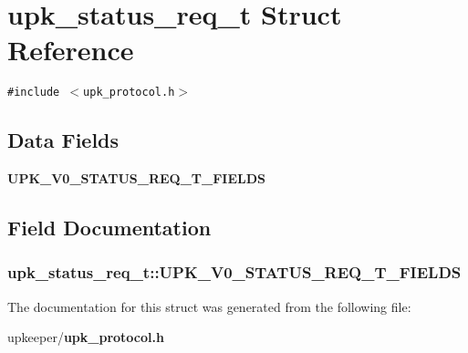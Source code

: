 \section{upk\_\-status\_\-req\_\-t Struct Reference}
\label{structupk__status__req__t}
{\tt \#include $<$upk\_\-protocol.h$>$}

\subsection*{Data Fields}
\begin{CompactItemize}
\item 
\bf{UPK\_\-V0\_\-STATUS\_\-REQ\_\-T\_\-FIELDS}
\end{CompactItemize}


\subsection{Field Documentation}
\subsubsection{\setlength{\rightskip}{0pt plus 5cm}\bf{upk\_\-status\_\-req\_\-t::UPK\_\-V0\_\-STATUS\_\-REQ\_\-T\_\-FIELDS}}\label{structupk__status__req__t_97731d184e2ca9d0ac0f9e7e8719b0b8}




The documentation for this struct was generated from the following file:\begin{CompactItemize}
\item 
upkeeper/\bf{upk\_\-protocol.h}\end{CompactItemize}
